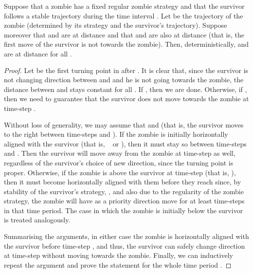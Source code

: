 \documentclass[12pt]{amsart}
\begin{document}
\begin{lemma}\label{lem:followtorus}
Suppose that a zombie has a fixed regular zombie strategy  and that the survivor follows a stable trajectory  during the time interval . Let  be the trajectory of the
zombie (determined by its strategy and the survivor's trajectory). Suppose moreover that  and  are at distance  and that  and  are also at distance  (that
is, the first move of the survivor is not towards the zombie). Then, deterministically,  and  are at distance  for all .
\end{lemma}
\begin{proof}
Let  be the first turning point in  after . It is clear that, since the survivor is not changing direction between  and  and he is not going towards the zombie, the
distance between  and  stays constant for all . If , then we are done. Otherwise, if , then we need to guarantee that the survivor does not move towards the zombie at time-step .

Without loss of generality, we may assume that  and  (that is, the survivor moves to the right between time-steps  and ). If the zombie is initially horizontally aligned with the survivor (that
is, ~ or ), then it must stay so between time-steps  and . Then the survivor will move away from the zombie at time-step  as well, regardless of the survivor's
choice of new direction, since the turning point  is proper. Otherwise, if the zombie is above the survivor at time-step  (that is, ),
then it must become horizontally aligned with them before they reach  since, by stability of the survivor's strategy, , and also due to the regularity of the zombie strategy, the zombie will have  as a priority direction move for at least
 time-steps in that time period. The case in which the zombie is initially below the survivor is treated analogously. 

Summarising the arguments, in either case the zombie is horizontally
aligned with the survivor before time-step , and thus, the survivor can safely change direction at time-step  without moving towards the zombie. Finally, we can inductively repeat the argument and prove the statement for the whole time period .
\end{proof}
\end{document}
